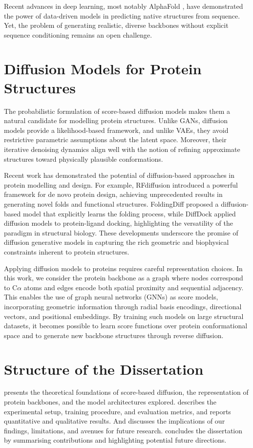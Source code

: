 \documentclass[12pt]{report}
\begin{document}
Recent advances in deep learning, most notably AlphaFold \cite{jumper2021HighlyAccurateProtein}, have demonstrated the power of data-driven models in predicting native structures from sequence. Yet, the problem of generating realistic, diverse backbones without explicit sequence conditioning remains an open challenge.

\section{Diffusion Models for Protein Structures}
The probabilistic formulation of score-based diffusion models makes them a natural candidate for modelling protein structures. Unlike GANs, diffusion models provide a likelihood-based framework, and unlike VAEs, they avoid restrictive parametric assumptions about the latent space. Moreover, their iterative denoising dynamics align well with the notion of refining approximate structures toward physically plausible conformations.

Recent work has demonstrated the potential of diffusion-based approaches in protein modelling and design. For example, RFdiffusion \cite{watsonNovoDesignProtein2023} introduced a powerful framework for de novo protein design, achieving unprecedented results in generating novel folds and functional structures. FoldingDiff \cite{wuProteinStructureGeneration2024} proposed a diffusion-based model that explicitly learns the folding process, while DiffDock \cite{yimDiffusionModelsProtein2024} applied diffusion models to protein-ligand docking, highlighting the versatility of the paradigm in structural biology. These developments underscore the promise of diffusion generative models in capturing the rich geometric and biophysical constraints inherent to protein structures.

Applying diffusion models to proteins requires careful representation choices. 
In this work, we consider the protein backbone as a graph where nodes correspond to C\(\alpha\) atoms and edges encode both spatial proximity and sequential adjacency. 
This enables the use of graph neural networks (GNNs) \cite{scarselliGraphNeuralNetwork2009} as score models, incorporating geometric information through radial basis encodings, directional vectors, and positional embeddings. 
By training such models on large structural datasets, it becomes possible to learn score functions over protein conformational space and to generate new backbone structures through reverse diffusion.

\section{Structure of the Dissertation}
 presents the theoretical foundations of score-based diffusion, the representation of protein backbones, and the model architectures explored.  describes the experimental setup, training procedure, and evaluation metrics, and reports quantitative and qualitative results. And discusses the implications of our findings, limitations, and avenues for future research.  concludes the dissertation by summarising contributions and highlighting potential future directions.
\end{document}
